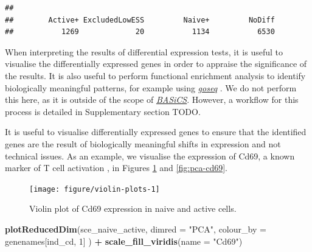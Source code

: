 \documentclass[9pt,a4paper,]{extarticle}
\newenvironment{Shaded}{\begin{snugshade}}{\end{snugshade}}
\newcommand{\CommentTok}[1]{\textcolor[rgb]{0.56,0.35,0.01}{\textit{#1}}}
\newcommand{\DataTypeTok}[1]{\textcolor[rgb]{0.13,0.29,0.53}{#1}}
\newcommand{\DecValTok}[1]{\textcolor[rgb]{0.00,0.00,0.81}{#1}}
\newcommand{\KeywordTok}[1]{\textcolor[rgb]{0.13,0.29,0.53}{\textbf{#1}}}
\newcommand{\NormalTok}[1]{#1}
\newcommand{\OperatorTok}[1]{\textcolor[rgb]{0.81,0.36,0.00}{\textbf{#1}}}
\newcommand{\StringTok}[1]{\textcolor[rgb]{0.31,0.60,0.02}{#1}}
\begin{document}
\begin{verbatim}
## 
##        Active+ ExcludedLowESS         Naive+         NoDiff 
##           1269             20           1134           6530
\end{verbatim}

When interpreting the results of differential expression tests, it is useful
to visualise the differentially expressed genes in order to appraise the
significance of the results. It is also useful to
perform functional enrichment analysis to identify biologically
meaningful patterns, for example using \emph{\href{https://bioconductor.org/packages/3.11/goseq}{goseq}} \citep{Young2010}.
We do not perform this here, as it is outside of the scope of
\emph{\href{https://bioconductor.org/packages/3.11/BASiCS}{BASiCS}}. However, a workflow for this process
is detailed in Supplementary section TODO.

It is useful to visualise differentially expressed genes to ensure that
the identified genes are the result of biologically meaningful shifts in
expression and not technical issues. As an example, we visualise the
expression of Cd69, a known marker of T cell activation \citep{Ziegler1994},
in Figures \ref{fig:violin-plots} and \ref{fig:pca-cd69}.

\begin{Shaded}
\end{Shaded}

\begin{figure}

{\centering \texttt{[image: figure/violin-plots-1]} 

}

\caption{Violin plot of Cd69 expression in naive and active cells.}\label{fig:violin-plots}
\end{figure}

\begin{Shaded}
\begin{Highlighting}[]
\KeywordTok{plotReducedDim}\NormalTok{(sce_naive_active,}
  \DataTypeTok{dimred =} \StringTok{"PCA"}\NormalTok{,}
  \DataTypeTok{colour_by =}\NormalTok{ genenames[ind_cd, }\DecValTok{1}\NormalTok{]}
\NormalTok{) }\OperatorTok{+}\StringTok{ }\KeywordTok{scale_fill_viridis}\NormalTok{(}\DataTypeTok{name =} \StringTok{"Cd69"}\NormalTok{)}
\end{Highlighting}
\end{Shaded}
\end{document}
